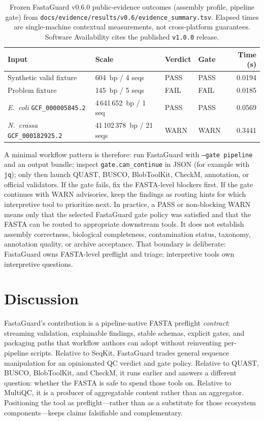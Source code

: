 \documentclass[11pt,a4paper]{article}
\begin{document}
\begin{table}[t]
  \centering
  \caption{Frozen FastaGuard v0.6.0 public-evidence outcomes (assembly profile,
  pipeline gate) from \texttt{docs/evidence/results/v0.6/evidence\_summary.tsv}.
  Elapsed times are single-machine contextual measurements, not cross-platform
  guarantees. Software Availability cites the published \texttt{v1.0.0} release.}
  \label{tab:evidence}
  \begin{tabular}{@{}llllr@{}}
    \toprule
    Input & Scale & Verdict & Gate & Time (s) \\
    \midrule
    Synthetic valid fixture & 604~bp / 4 seqs & PASS & PASS & 0.0194 \\
    Problem fixture & 145~bp / 5 seqs & FAIL & FAIL & 0.0185 \\
    \emph{E.\ coli} \texttt{GCF\_000005845.2} & 4\,641\,652~bp / 1 seq & PASS & PASS & 0.0569 \\
    \emph{N.\ crassa} \texttt{GCF\_000182925.2} & 41\,102\,378~bp / 21 seqs & WARN & WARN & 0.3441 \\
    \bottomrule
  \end{tabular}
\end{table}

A minimal workflow pattern is therefore: run FastaGuard with
\texttt{--gate pipeline} and an output bundle; inspect
\texttt{gate.can\_continue} in JSON (for example with \texttt{jq}); only then
launch QUAST, BUSCO, BlobToolKit, CheckM, annotation, or official validators.
If the gate fails, fix the FASTA-level blockers first.
If the gate continues with WARN advisories, keep the findings as routing hints
for which interpretive tool to prioritize next.
In practice, a PASS or non-blocking WARN means only that the selected FastaGuard
gate policy was satisfied and that the FASTA can be routed to appropriate
downstream tools.
It does not establish assembly correctness, biological completeness,
contamination status, taxonomy, annotation quality, or archive acceptance.
That boundary is deliberate: FastaGuard owns FASTA-level preflight and triage;
interpretive tools own interpretive questions.

\section{Discussion}
FastaGuard's contribution is a pipeline-native FASTA preflight \emph{contract}:
streaming validation, explainable findings, stable schemas, explicit gates, and
packaging paths that workflow authors can adopt without reinventing per-pipeline
scripts.
Relative to SeqKit, FastaGuard trades general sequence manipulation for an
opinionated QC verdict and gate policy.
Relative to QUAST, BUSCO, BlobToolKit, and CheckM, it runs earlier and answers a
different question: whether the FASTA is safe to spend those tools on.
Relative to MultiQC, it is a producer of aggregatable content rather than an
aggregator.
Positioning the tool as preflight---rather than as a substitute for those
ecosystem components---keeps claims falsifiable and complementary.
\end{document}
